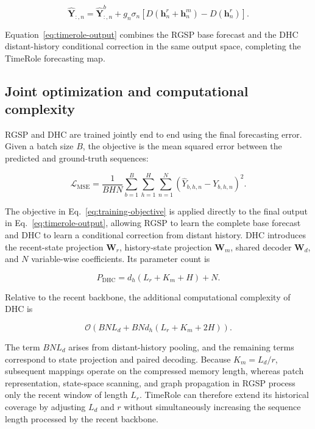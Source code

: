 \begin{equation}
\widehat{\mathbf{Y}}_{:,n}
=\widehat{\mathbf{Y}}^{b}_{:,n}
+g_n\sigma_n\!\left[
D(\mathbf{h}^{r}_{n}+\mathbf{h}^{m}_{n})
-D(\mathbf{h}^{r}_{n})
\right].
\label{eq:timerole-output}
\end{equation}

Equation~\eqref{eq:timerole-output} combines the RGSP base forecast and the DHC distant-history conditional correction in the same output space, completing the TimeRole forecasting map.

\subsection{Joint optimization and computational complexity}

RGSP and DHC are trained jointly end to end using the final forecasting error. Given a batch size \(B\), the objective is the mean squared error between the predicted and ground-truth sequences:

\begin{equation}
\mathcal{L}_{\mathrm{MSE}}
=\frac{1}{BHN}
\sum_{b=1}^{B}\sum_{h=1}^{H}\sum_{n=1}^{N}
(\widehat{Y}_{b,h,n}-Y_{b,h,n})^2.
\label{eq:training-objective}
\end{equation}

The objective in Eq.~\eqref{eq:training-objective} is applied directly to the final output in Eq.~\eqref{eq:timerole-output}, allowing RGSP to learn the complete base forecast and DHC to learn a conditional correction from distant history. DHC introduces the recent-state projection \(\mathbf W_r\), history-state projection \(\mathbf W_m\), shared decoder \(\mathbf W_d\), and \(N\) variable-wise coefficients. Its parameter count is

\begin{equation}
P_{\mathrm{DHC}}=d_h(L_r+K_m+H)+N.
\label{eq:dhc-parameters}
\end{equation}

Relative to the recent backbone, the additional computational complexity of DHC is

\begin{equation}
\mathcal{O}\!\left(BNL_d+BNd_h(L_r+K_m+2H)\right).
\label{eq:dhc-complexity}
\end{equation}

The term \(BNL_d\) arises from distant-history pooling, and the remaining terms correspond to state projection and paired decoding. Because \(K_m=L_d/r\), subsequent mappings operate on the compressed memory length, whereas patch representation, state-space scanning, and graph propagation in RGSP process only the recent window of length \(L_r\). TimeRole can therefore extend its historical coverage by adjusting \(L_d\) and \(r\) without simultaneously increasing the sequence length processed by the recent backbone.

